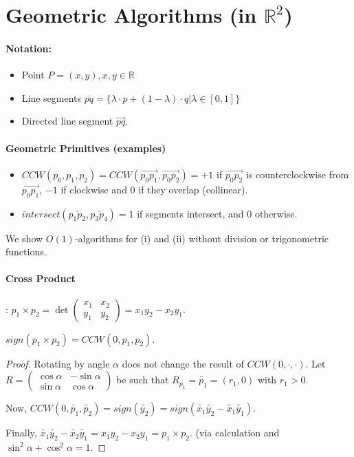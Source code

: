 \section{Geometric Algorithms (in $\mathbb{R}^2$)}

\paragraph{Notation:}
\begin{itemize}
	\item Point $P=(x,y), x, y \in \mathbb{R}$
	\item Line segments $\overline{pq} = \{\lambda \cdot p + (1 - \lambda) \cdot q | \lambda \in [0,1]\}$
	\item Directed line segment $\overrightarrow{pq}$.
\end{itemize}

\paragraph{Geometric Primitives (examples)}

\begin{itemize}
	\item ${CCW}(p_0, p_1, p_2) = {CCW}(\overrightarrow{p_0 p_1}, \overrightarrow{p_0 p_2}) = +1$ if $\overrightarrow{p_0 p_2}$ is counterclockwise from $\overrightarrow{p_0 p_1}$, $-1$ if clockwise and $0$ if they overlap (collinear).
	\item ${intersect}(\overline{p_1 p_2}, \overline{p_3 p_4}) = 1$ if segments intersect, and 0 otherwise.
\end{itemize}

We show $O(1)$-algorithms for (i) and (ii) without division or trigonometric functions.

\paragraph{Cross Product}: $p_1 \times p_2 = \det \left ( \begin{smallmatrix} x_1 & x_2\\ y_1 & y_2 \end{smallmatrix} \right ) = x_1 y_2 - x_2 y_1$.

\begin{mylemma}
${sign}(p_1 \times p_2) = {CCW}(0,p_1,p_2)$.	
\end{mylemma}
\begin{proof}
	Rotating by angle $\alpha$ does not change the result of ${CCW}(0, \cdot, \cdot)$.
	Let $R = \left ( \begin{smallmatrix} \cos \alpha & - \sin \alpha\\ \sin \alpha & \cos \alpha \end{smallmatrix} \right )$	 be such that $R_{p_1} = \tilde{p_1} = (r_1, 0)$ with $r_1>0$.
	
	Now, $CCW(0, \tilde{p_1}, \tilde{p_2}) = {sign}(\tilde{y_2}) = {sign}(\tilde{x_1} \tilde{y_2} - \tilde{x_1} \tilde{y_1})$.
	
	Finally, $\tilde{x_1} \tilde{y_2} - \tilde{x_2} \tilde{y_1} = x_1 y_2 - x_2 y_1 = p_1 \times p_2$. (via calculation and $\sin^2 \alpha + \cos^2 \alpha = 1$.
\end{proof}

